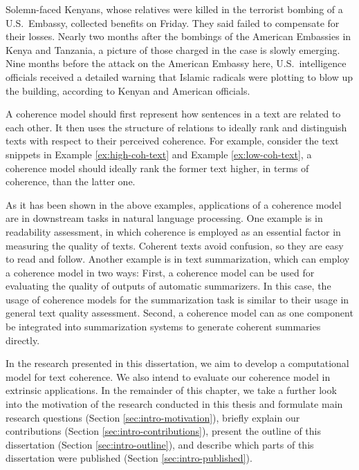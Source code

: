 \begin{examples}
\label{ex:low-coh-text}
Solemn-faced Kenyans, whose relatives were killed in the terrorist bombing of a U.S.\ Embassy, collected benefits on Friday. 
They said failed to compensate for their losses. 
Nearly two months after the bombings of the American Embassies in Kenya and Tanzania, a picture of those charged in the case is slowly emerging. 
Nine months before the attack on the American Embassy here, U.S.\ intelligence officials received a detailed warning that Islamic radicals were plotting to blow up the building, according to Kenyan and American officials. 
\end{examples}

A coherence model should first represent how sentences in a text are related to each other. 
It then uses the structure of relations to ideally rank and distinguish texts with respect to their perceived coherence.  
For example, consider the text snippets in Example \ref{ex:high-coh-text} and Example \ref{ex:low-coh-text}, a coherence model should ideally rank the former text higher, in terms of coherence, than the latter one. 

As it has been shown in the above examples, applications of a coherence model are in downstream tasks in natural language processing. 
One example is in readability assessment, in which coherence is employed as an essential factor in measuring the quality of texts. 
Coherent texts avoid confusion, so they are easy to read and follow. 
Another example is in text summarization, which can employ a coherence model in two ways:   
First, a coherence model can be used for evaluating the quality of outputs of automatic summarizers. 
In this case, the usage of coherence models for the summarization task is similar to their usage in general text quality assessment. 
Second, a coherence model can as one component be integrated into summarization systems to generate coherent summaries directly. 

In the research presented in this dissertation, we aim to develop a computational model for text coherence. 
We also intend to evaluate our coherence model in extrinsic applications. 
In the remainder of this chapter, we take a further look into the motivation of the research conducted in this thesis and formulate main research questions (Section \ref{sec:intro-motivation}), briefly explain our contributions (Section \ref{sec:intro-contributions}), present the outline of this dissertation (Section \ref{sec:intro-outline}), and describe which parts of this dissertation were published (Section \ref{sec:intro-published}). 

